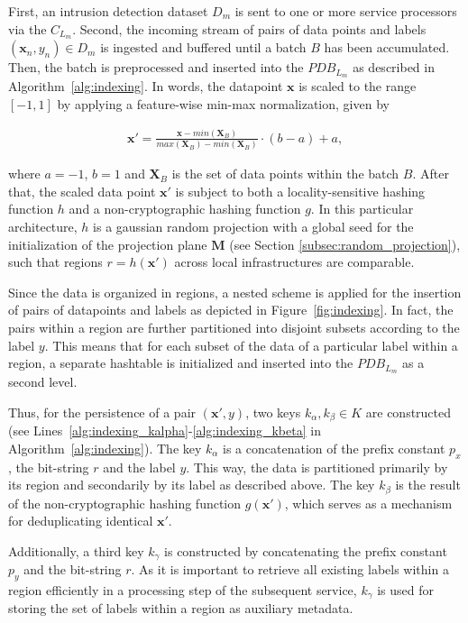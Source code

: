 First, an intrusion detection dataset $D_m$ is sent to one or more service processors via the $C_{L_m}$. Second, the incoming stream of pairs of data points and labels $(\bm{x}_n, y_n) \in D_m$ is ingested and buffered until a batch $B$ has been accumulated. Then, the batch is preprocessed and inserted into the $PDB_{L_m}$ as described in Algorithm~\ref{alg:indexing}. In words, the datapoint $\bm{x}$ is scaled to the range $[-1, 1]$ by applying a feature-wise min-max normalization, given by

\begin{align}\label{eq:normalization}
    \bm{x}' = \frac{\bm{x}-min(\bm{X}_B)}{max(\bm{X}_B) - min(\bm{X}_B)} \cdot (b - a) + a,
\end{align}

where $a=-1$, $b=1$ and $\bm{X}_B$ is the set of data points within the batch $B$. After that, the scaled data point $\bm{x}'$ is subject to both a locality-sensitive hashing function $h$ and a non-cryptographic hashing function $g$. In this particular architecture, $h$ is a gaussian random projection with a global seed for the initialization of the projection plane $\bm{M}$ (see Section \ref{subsec:random_projection}), such that regions $r = h(\bm{x}')$ across local infrastructures are comparable.

Since the data is organized in regions, a nested scheme is applied for the insertion of pairs of datapoints and labels as depicted in Figure~\ref{fig:indexing}. In fact, the pairs within a region are further partitioned into disjoint subsets according to the label $y$. This means that for each subset of the data of a particular label within a region, a separate hashtable is initialized and inserted into the $PDB_{L_m}$ as a second level. 

Thus, for the persistence of a pair $(\bm{x}', y)$, two keys $k_\alpha, k_\beta \in K$ are constructed (see Lines~\ref{alg:indexing_kalpha}-\ref{alg:indexing_kbeta} in Algorithm~\ref{alg:indexing}). The key $k_\alpha$ is a concatenation of the prefix constant $p_x$, the bit-string $r$ and the label $y$. This way, the data is partitioned primarily by its region and secondarily by its label as described above. The key $k_\beta$ is the result of the non-cryptographic hashing function $g(\bm{x}')$, which serves as a mechanism for deduplicating identical $\bm{x}'$. 

Additionally, a third key $k_\gamma$ is constructed by concatenating the prefix constant $p_y$ and the bit-string $r$. As it is important to retrieve all existing labels within a region efficiently in a processing step of the subsequent service, $k_\gamma$ is used for storing the set of labels within a region as auxiliary metadata.

